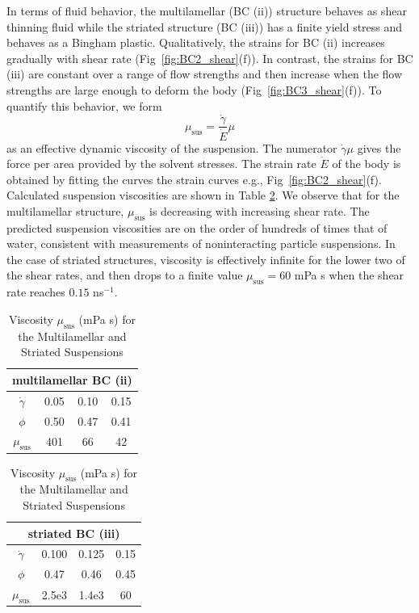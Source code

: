 \documentclass[prb,preprint,showpacs,preprintnumbers,amsmath,amssymb,longbibliography]{revtex4-1}
\begin{document}
In terms of fluid behavior,
the multilamellar (BC (ii)) structure behaves as shear thinning fluid
while the striated structure (BC (iii)) has a finite yield stress and
behaves as a Bingham plastic. 
Qualitatively, the strains for BC (ii) increases gradually 
with shear rate (Fig~\ref{fig:BC2_shear}(f)).
In contrast, the strains for BC (iii) are constant over a range of flow strengths
and then increase when the flow strengths are large enough
to deform the body (Fig~\ref{fig:BC3_shear}(f)).
To quantify this behavior, we form 
\[
\mu_{\text{sus}} = \frac{\dot \gamma}{\dot E} \mu
\]
as an effective dynamic viscosity of the suspension.
The numerator $\dot \gamma \mu$ gives the force per area provided by the solvent stresses. 
The strain rate $\dot E$ of the body is obtained by fitting the curves the strain curves e.g.,
Fig~\ref{fig:BC2_shear}(f).
Calculated suspension viscosities are shown
in Table \ref{tbl:bcii_visc}.
We observe that for the multilamellar structure, $\mu_{\text{sus}}$ is decreasing
with increasing shear rate.  The predicted suspension viscosities 
are on the order of hundreds of times that of water, consistent with
measurements of noninteracting particle suspensions\cite{KONIJN201461}.
In the case of striated structures, viscosity is effectively infinite
for the lower two of the shear rates, and then drops to a finite value $\mu_{\text{sus}} = 60$ mPa s
when the shear rate reaches $0.15$ ns$^{-1}$.
\begin{table}
  \caption{Viscosity $\mu_{\text{sus}}$ (mPa s) for the Multilamellar and Striated Suspensions    
\label{tbl:bcii_visc}
}
\centering
\begin{tabular}{c|c|c|c}
\multicolumn{4}{c}{multilamellar BC (ii)} \\
\hline
  $\dot \gamma$ & 0.05 & 0.10 & 0.15\\
  \hline
  $\phi$ & 0.50 & 0.47 & 0.41\\
  \hline
  $\mu_{\text{sus}} $ & 401 & 66 & 42\\
\hline
\end{tabular}
\quad \quad \quad
\begin{tabular}{c|c|c|c}
\multicolumn{4}{c}{striated BC (iii)} \\
\hline
  $\dot \gamma$ & 0.100 & 0.125 & 0.15\\
  \hline
  $\phi$ & 0.47 & 0.46 & 0.45\\
  \hline
  $\mu_{\text{sus}} $ & 2.5e3 & 1.4e3 & 60\\
\hline
\end{tabular}
\end{table}
\end{document}
